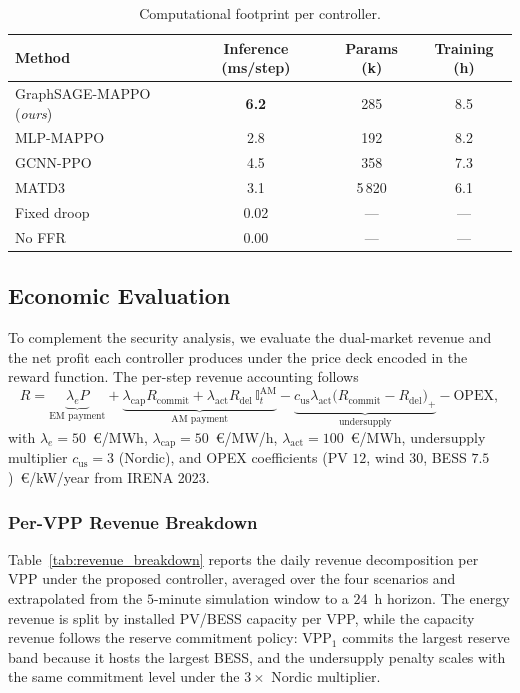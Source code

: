 \begin{table}[!t]
\caption{Computational footprint per controller.}
\label{tab:compute}
\centering
\footnotesize
\begin{tabular}{lccc}
\toprule
Method & Inference (ms/step) & Params (k) & Training (h) \\
\midrule
GraphSAGE-MAPPO (\emph{ours}) & \textbf{6.2}  & 285        & 8.5 \\
MLP-MAPPO                     & 2.8           & 192        & 8.2 \\
GCNN-PPO~\cite{guo2024gcnnppo}& 4.5           & 358        & 7.3 \\
MATD3~\cite{li2025matd3}      & 3.1           & 5\,820     & 6.1 \\
Fixed droop                   & 0.02          & ---        & --- \\
No FFR                        & 0.00          & ---        & --- \\
\bottomrule
\end{tabular}
\end{table}

\subsection{Economic Evaluation}
\label{ssec:economic}

To complement the security analysis, we evaluate the dual-market
revenue and the net profit each controller produces under the price
deck encoded in the reward function. The per-step revenue accounting
follows
\begin{equation}
R=\underbrace{\lambda_e P}_{\text{EM payment}}
+\underbrace{\lambda_{\mathrm{cap}}R_{\mathrm{commit}}
+\lambda_{\mathrm{act}}R_{\mathrm{del}}\,\mathbb{I}^{\mathrm{AM}}_t}_{\text{AM payment}}
-\underbrace{c_{\mathrm{us}}\lambda_{\mathrm{act}}\bigl(R_{\mathrm{commit}}-R_{\mathrm{del}}\bigr)_{+}}_{\text{undersupply}}
-\mathrm{OPEX},
\label{eq:revenue_acct}
\end{equation}
with $\lambda_e=50$~\euro/MWh,
$\lambda_{\mathrm{cap}}=50$~\euro/MW/h,
$\lambda_{\mathrm{act}}=100$~\euro/MWh, undersupply multiplier
$c_{\mathrm{us}}=3$ (Nordic), and OPEX coefficients
(PV $12$, wind $30$, BESS $7.5$)~\euro/kW/year from IRENA 2023.

\subsubsection*{Per-VPP Revenue Breakdown}
Table~\ref{tab:revenue_breakdown} reports the daily revenue
decomposition per VPP under the proposed controller, averaged over
the four scenarios and extrapolated from the $5$-minute simulation
window to a $24$~h horizon. The energy revenue is split by installed
PV/BESS capacity per VPP, while the capacity revenue follows the
reserve commitment policy: VPP$_{1}$ commits the largest reserve
band because it hosts the largest BESS, and the undersupply penalty
scales with the same commitment level under the $3\times$ Nordic
multiplier.

